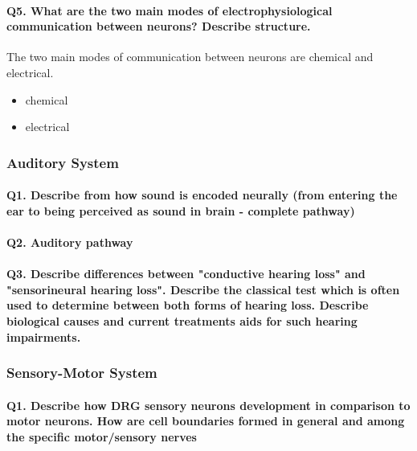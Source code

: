 \documentclass[12pt,article,oneside,a4paper]{memoir}
\begin{document}
\paragraph{Q5. What are the two main modes of electrophysiological communication between neurons? Describe structure.}
The two main modes of communication between neurons are chemical and electrical.
\begin{itemize}
\item chemical
\item electrical
\end{itemize}


\subsubsection{Auditory System}
\paragraph{Q1. Describe from how sound is encoded neurally (from entering the ear to being perceived as sound in brain - complete pathway)}

\paragraph{Q2. Auditory pathway}

\paragraph{Q3. Describe differences between "conductive hearing loss" and "sensorineural hearing loss". Describe the classical test which is often used to determine between both forms of hearing loss. Describe biological causes and current treatments aids for such hearing impairments.}

\subsubsection{Sensory-Motor System}
\paragraph{Q1. Describe how DRG sensory neurons development in comparison to motor neurons. How are cell boundaries formed in general and among the specific motor/sensory nerves}
\end{document}
